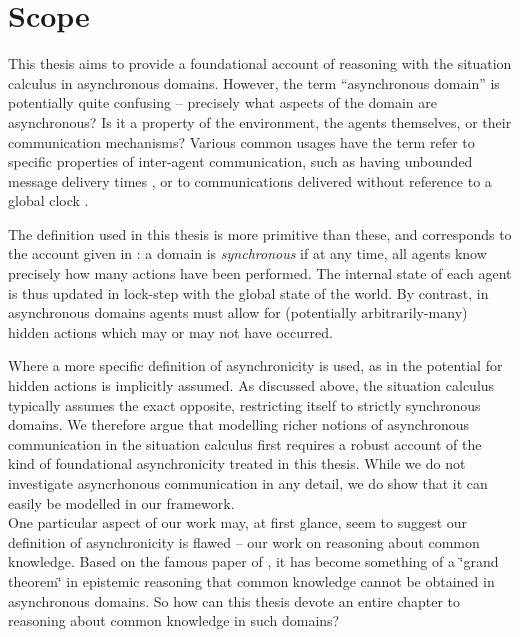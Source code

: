 \section{Scope}

This thesis aims to provide a foundational account of reasoning with
the situation calculus in asynchronous domains. However, the term
{}``asynchronous domain'' is potentially quite confusing -- precisely
what aspects of the domain are asynchronous? Is it a property of the
environment, the agents themselves, or their communication mechanisms?
Various common usages have the term refer to specific properties of
inter-agent communication, such as having unbounded message delivery
times \citep{fischer85distributed_consensus}, or to communications
delivered without reference to a global clock \citep{halpern90knowledge_distrib}.

The definition used in this thesis is more primitive than these, and
corresponds to the account given in \citep{vanBentham06tree_of_knowledge}:
a domain is \emph{synchronous} if at any time, all agents know precisely
how many actions have been performed. The internal state of each agent
is thus updated in lock-step with the global state of the world. By
contrast, in asynchronous domains agents must allow for (potentially
arbitrarily-many) hidden actions which may or may not have occurred.

Where a more specific definition of asynchronicity is used, as in
\citep{fischer85distributed_consensus,halpern90knowledge_distrib}
the potential for hidden actions is implicitly assumed. As discussed
above, the situation calculus typically assumes the exact opposite,
restricting itself to strictly synchronous domains. We therefore argue
that modelling richer notions of asynchronous communication in the
situation calculus first requires a robust account of the kind of
foundational asynchronicity treated in this thesis. While we do not
investigate asyncrhonous communication in any detail, we do show that
it can easily be modelled in our framework. \\


One particular aspect of our work may, at first glance, seem to suggest
our definition of asynchronicity is flawed -- our work on reasoning
about common knowledge. Based on the famous paper of \citet{halpern90knowledge_distrib},
it has become something of a \char`\"{}grand theorem\char`\"{} in
epistemic reasoning that common knowledge cannot be obtained in asynchronous
domains. So how can this thesis devote an entire chapter to reasoning
about common knowledge in such domains?


